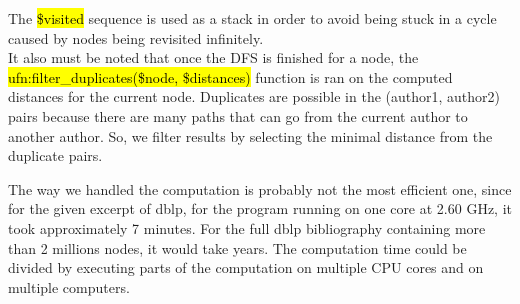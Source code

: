 The \hl{\$visited} sequence is used as a stack in order to avoid being stuck in
a cycle caused by nodes being revisited infinitely.\\

It also must be noted that once the DFS is finished for a node, the
\hl{ufn:filter\_duplicates(\$node, \$distances)} function is ran on the computed
distances for the current node. Duplicates are possible in the
(author1, author2) pairs because there are many paths that can go from the
current author to another author. So, we filter results by selecting the minimal
distance from the duplicate pairs.\\

\begin{framewarning}
    The way we handled the computation is probably not the most efficient one,
    since for the given excerpt of dblp, for the program running on one core at
    2.60 GHz, it took approximately 7 minutes. For the full dblp bibliography
    containing more than 2 millions nodes, it would take years. The computation
    time could be divided by executing parts of the computation on multiple CPU
    cores and on multiple computers.
\end{framewarning}

\newpage
